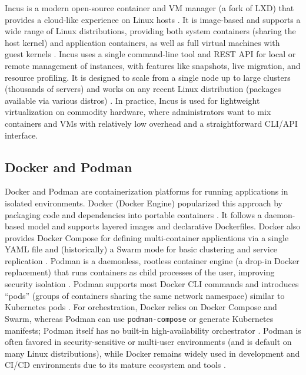 Incus is a modern open-source container and VM manager (a fork of LXD) that provides a cloud-like experience on Linux hosts \cite{IncusLinuxContainers2023}. It is image-based and supports a wide range of Linux distributions, providing both system containers (sharing the host kernel) and application containers, as well as full virtual machines with guest kernels \cite{IncusLinuxContainers2023}. Incus uses a single command-line tool and REST API for local or remote management of instances, with features like snapshots, live migration, and resource profiling. It is designed to scale from a single node up to large clusters (thousands of servers) \cite{IncusLinuxContainers2023} and works on any recent Linux distribution (packages available via various distros) \cite{IncusLinuxContainers2023}. In practice, Incus is used for lightweight virtualization on commodity hardware, where administrators want to mix containers and VMs with relatively low overhead and a straightforward CLI/API interface.

\subsection{Docker and Podman}

Docker and Podman are containerization platforms for running applications in isolated environments. Docker (Docker Engine) popularized this approach by packaging code and dependencies into portable containers \cite{SpaceliftPodmanDocker2024}. It follows a daemon-based model and supports layered images and declarative Dockerfiles. Docker also provides Docker Compose for defining multi-container applications via a single YAML file and (historically) a Swarm mode for basic clustering and service replication \cite{SpaceliftPodmanDocker2024}. Podman is a daemonless, rootless container engine (a drop-in Docker replacement) that runs containers as child processes of the user, improving security isolation \cite{SpaceliftPodmanDocker2024}. Podman supports most Docker CLI commands and introduces “pods” (groups of containers sharing the same network namespace) similar to Kubernetes pods \cite{SpaceliftPodmanDocker2024}. For orchestration, Docker relies on Docker Compose and Swarm, whereas Podman can use \texttt{podman-compose} or generate Kubernetes manifests; Podman itself has no built-in high-availability orchestrator \cite{SpaceliftPodmanDocker2024}. Podman is often favored in security-sensitive or multi-user environments (and is default on many Linux distributions), while Docker remains widely used in development and CI/CD environments due to its mature ecosystem and tools \cite{SpaceliftPodmanDocker2024}.

